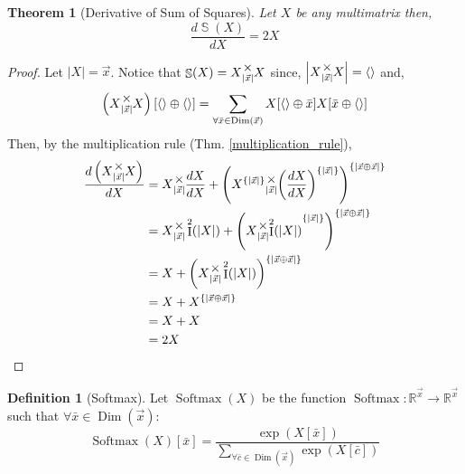 \documentclass[12pt]{book}
\theoremstyle{plain}
\newtheorem{theorem}{Theorem}[chapter]
\theoremstyle{definition}
\newtheorem{definition}{Definition}[chapter]
\theoremstyle{ppart}
\theoremstyle{case}
\theoremstyle{solution}
\DeclareMathOperator{\Dim}{Dim}
\DeclareMathOperator{\Ident}{I}
\DeclareMathOperator{\SoS}{\mathbb{S}}
\DeclareMathOperator{\Softmax}{Softmax}
\newcommand{\mmult}[1]{\text{\raisebox{1ex}{$\underset{#1}{\times}$}}}
\newcommand{\shape}[1]{\left|#1\right|}
\newcommand{\transpose}[2]{{#1}^{\{#2\}}}
\begin{document}
\begin{theorem}[Derivative of Sum of Squares]
Let $X$ be any multimatrix then,
\[ \frac{d \SoS(X)}{dX} = 2X \]
\end{theorem}
\begin{proof}
Let $\shape{X} = \vec{x}$. Notice that $\SoS(X) = X \mmult{\shape{\vec{x}}} X$ since,
$\shape{X \mmult{\shape{\vec{x}}} X} = \left<\right>$ and,
\[
  \left(X \mmult{\shape{\vec{x}}} X\right)[\left<\right> \oplus \left<\right>]
  =
  \sum_{\forall \bar{x} \in \Dim(\vec{x})}
    X[\left<\right> \oplus \bar{x}]
    X[\bar{x} \oplus \left<\right>]
\]
Then, by the multiplication rule (Thm. \ref{multiplication_rule}),
\begin{align*}
  \frac{d\left(X \mmult{\shape{\vec{x}}} X\right)}{dX}
  &=
  X \mmult{\shape{\vec{x}}} \frac{dX}{dX} +
  \transpose{\left(
    \transpose{X}{\shape{\vec{x}}}
      \mmult{\shape{\vec{x}}}
    \transpose{\left(\frac{dX}{dX}\right)}{\shape{\vec{x}}}
  \right)}{\shape{\vec{x} \oplus \vec{x}}} \\
  &=
  X \mmult{\shape{\vec{x}}} \Ident^2(\shape{X}) +
  \transpose{\left(
    X
      \mmult{\shape{\vec{x}}}
    \transpose{\Ident^2(\shape{X})}{\shape{\vec{x}}}
  \right)}{\shape{\vec{x} \oplus \vec{x}}} \\
  &=
  X +
  \transpose{\left(
    X
      \mmult{\shape{\vec{x}}}
    \Ident^2(\shape{X})
  \right)}{\shape{\vec{x} \oplus \vec{x}}} \\
  &=
  X +
  \transpose{X}{\shape{\vec{x} \oplus \vec{x}}} \\
  &= X + X \\
  &= 2X
\end{align*}
\end{proof}

\begin{definition}[Softmax]
Let $\Softmax(X)$ be the function
$\Softmax : \mathbb{R}^{\vec{x}} \to \mathbb{R}^{\vec{x}}$
such that $\forall \bar{x} \in \Dim(\vec{x}):$
\[
  \Softmax(X)[\bar{x}] = \frac{
		\exp(X[\bar{x}])
	}{
		\sum_{\forall \bar{c} \in \Dim(\vec{x})} \exp(X[\bar{c}])
	}
\]
\end{definition}
\end{document}
